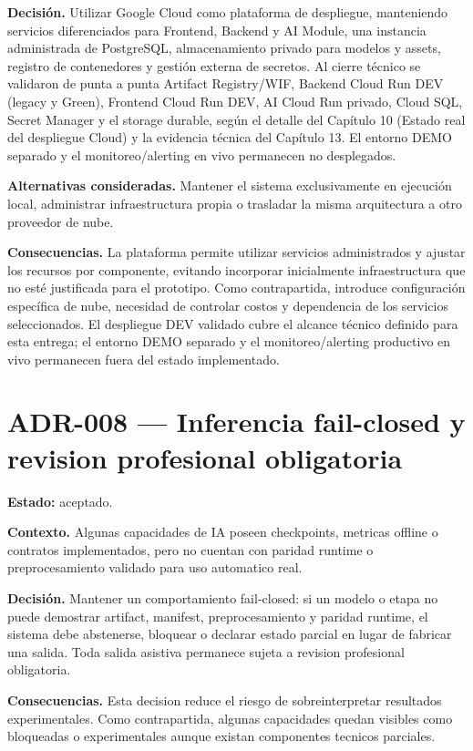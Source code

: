 \textbf{Decisión.} Utilizar Google Cloud como plataforma de despliegue, manteniendo servicios diferenciados para Frontend, Backend y AI Module, una instancia administrada de PostgreSQL, almacenamiento privado para modelos y assets, registro de contenedores y gestión externa de secretos. Al cierre técnico se validaron de punta a punta Artifact Registry/WIF, Backend Cloud Run DEV (legacy y Green), Frontend Cloud Run DEV, AI Cloud Run privado, Cloud SQL, Secret Manager y el storage durable, según el detalle del Capítulo 10 (Estado real del despliegue Cloud) y la evidencia técnica del Capítulo 13. El entorno DEMO separado y el monitoreo/alerting en vivo permanecen no desplegados.

\textbf{Alternativas consideradas.} Mantener el sistema exclusivamente en ejecución local, administrar infraestructura propia o trasladar la misma arquitectura a otro proveedor de nube.

\textbf{Consecuencias.} La plataforma permite utilizar servicios administrados y ajustar los recursos por componente, evitando incorporar inicialmente infraestructura que no esté justificada para el prototipo. Como contrapartida, introduce configuración específica de nube, necesidad de controlar costos y dependencia de los servicios seleccionados. El despliegue DEV validado cubre el alcance técnico definido para esta entrega; el entorno DEMO separado y el monitoreo/alerting productivo en vivo permanecen fuera del estado implementado.

\section*{ADR-008 --- Inferencia fail-closed y revision profesional obligatoria}

\textbf{Estado:} aceptado.

\textbf{Contexto.} Algunas capacidades de IA poseen checkpoints, metricas offline o contratos implementados, pero no cuentan con paridad runtime o preprocesamiento validado para uso automatico real.

\textbf{Decisión.} Mantener un comportamiento fail-closed: si un modelo o etapa no puede demostrar artifact, manifest, preprocesamiento y paridad runtime, el sistema debe abstenerse, bloquear o declarar estado parcial en lugar de fabricar una salida. Toda salida asistiva permanece sujeta a revision profesional obligatoria.

\textbf{Consecuencias.} Esta decision reduce el riesgo de sobreinterpretar resultados experimentales. Como contrapartida, algunas capacidades quedan visibles como bloqueadas o experimentales aunque existan componentes tecnicos parciales.

